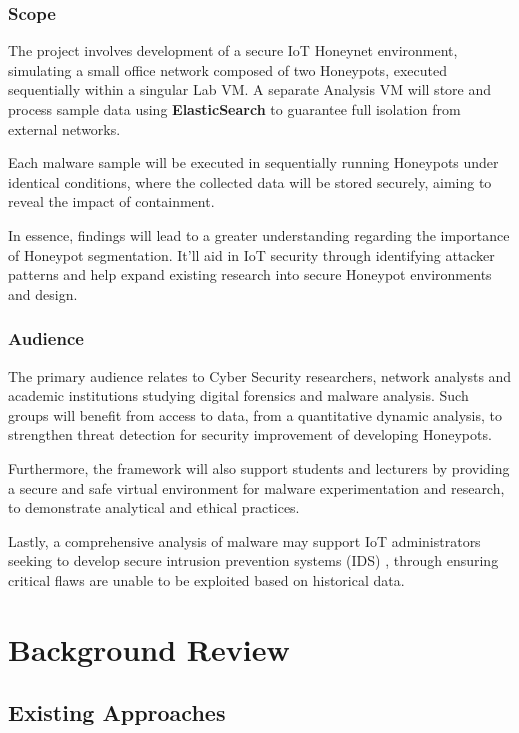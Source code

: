 \documentclass[a4paper,12pt,oneside]{book}			%
\begin{document}
\subsection{Scope}\label{sec:scope}

The project involves development of a secure IoT Honeynet environment, simulating a small office network composed of two Honeypots, executed sequentially within a singular Lab VM. A separate Analysis VM will store and process sample data using \textbf{ElasticSearch} to guarantee full isolation from external networks.

Each malware sample will be executed in sequentially running Honeypots under identical conditions, where the collected data will be stored securely, aiming to reveal the impact of containment.

In essence, findings will lead to a greater understanding regarding the importance of Honeypot segmentation. It’ll aid in IoT security through identifying attacker patterns \textit{\citep{Kocaogullar2023honeypots}} and help expand existing research into secure Honeypot environments and design.

\subsection{Audience}\label{sec:audience}

The primary audience relates to Cyber Security researchers, network analysts and academic institutions studying digital forensics and malware analysis. Such groups will benefit from access to data, from a quantitative dynamic analysis, to strengthen threat detection for security improvement of developing Honeypots.

Furthermore, the framework will also support students and lecturers by providing a secure and safe virtual environment for malware experimentation and research, to demonstrate analytical and ethical practices. 

Lastly, a comprehensive analysis of malware may support IoT administrators seeking to develop secure intrusion prevention systems (IDS) \textit{\citep{fortinet-IDS}}, through ensuring critical flaws are unable to be exploited based on historical data.


\chapter{Background Review}\label{ch:backgroundReview}

\section{Existing Approaches}\label{sec:existingApproaches}
\end{document}
